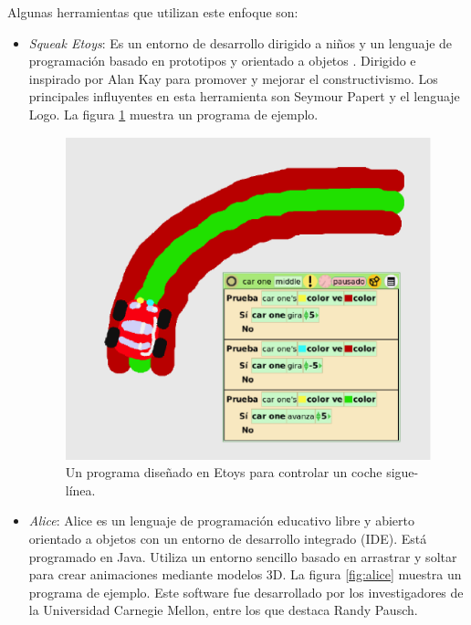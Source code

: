 \documentclass{llncs}
\begin{document}
Algunas herramientas que utilizan este enfoque son:
\begin{itemize}
\item {\em Squeak Etoys}: Es un entorno de desarrollo dirigido a niños y un lenguaje de programación basado en prototipos y orientado a objetos \cite{etoysOnline}. Dirigido e inspirado por Alan Kay para promover y mejorar el constructivismo. Los principales influyentes en esta herramienta son Seymour Papert y el lenguaje Logo. La figura \ref{fig:etoys} muestra un programa de ejemplo.


\begin{figure}[ht]
\begin{center}
\includegraphics[scale=0.4]{images/etoys.eps}
\caption{Un programa diseñado en Etoys para controlar un coche sigue-línea.
\label{fig:etoys}}
\end{center}
\end{figure}

\item {\em Alice}: Alice \cite{AliceOnline} es un lenguaje de programación educativo libre y abierto orientado a objetos con un entorno de desarrollo integrado (IDE). Está programado en Java. Utiliza un entorno sencillo basado en arrastrar y soltar para crear animaciones mediante modelos 3D. La figura \ref{fig:alice} muestra un programa de ejemplo. Este software fue desarrollado por los investigadores de la Universidad Carnegie Mellon, entre los que destaca Randy Pausch.


\end{itemize}
\end{document}
